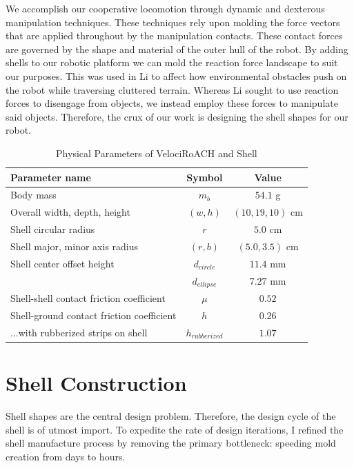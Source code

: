 \documentclass[letterpaper]{report}
\begin{document}
We accomplish our cooperative locomotion through dynamic and dexterous manipulation techniques.
These techniques rely upon molding the force vectors that are applied throughout by the manipulation contacts.
These contact forces are governed by the shape and material of the outer hull of the robot.
By adding shells to our robotic platform we can mold the reaction force landscape to suit our purposes.
This was used in Li \cite{ChenTerradynamic} to affect how environmental obstacles push on the robot while traversing cluttered terrain.
Whereas Li sought to use reaction forces to disengage from objects, we instead employ these forces to manipulate said objects.
Therefore, the crux of our work is designing the shell shapes for our robot.

\begin{table}[tb]
\renewcommand{\arraystretch}{1.1}
\caption{Physical Parameters of VelociRoACH and Shell}
\label{tab:Dimensions1}
\centering
\begin{tabular}{l c c}
\hline
Parameter name & Symbol & Value \\
\hline
Body mass & $m_b$ & $54.1$ g \\
Overall width, depth, height & $(w, h)$ & $(10, 19, 10)$ cm \\
Shell circular radius & $r$ & $5.0$ cm \\
Shell major, minor axis radius & $(r, b)$ & $(5.0, 3.5)$ cm \\
Shell center offset height & $d_{circle}$ & $11.4$ mm \\
                           & $d_{ellipse}$ & $7.27$ mm \\
Shell-shell contact friction coefficient & $\mu$ & $0.52$ \\
Shell-ground contact friction coefficient & $h$ & $0.26$ \\
...with rubberized strips on shell  & $h_{rubberized}$ & $1.07$ \\
\hline
\end{tabular}
\end{table}

\section{Shell Construction}
Shell shapes are the central design problem. Therefore, the design cycle of the shell is of utmost import.
To expedite the rate of design iterations, I refined the shell manufacture process by removing the primary bottleneck: speeding mold creation from days to hours.
\end{document}
